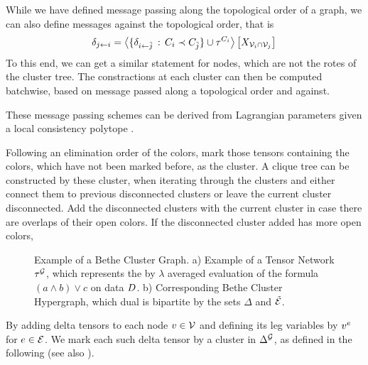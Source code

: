 While we have defined message passing along the topological order of a graph, we can also define messages against the topological order, that is
\begin{align*}
	\downmes{i}{j}  = \contractionof{\{\downmes{\tilde{j}}{i} \wcols  \enc \prec  \thirdenc\} \cup \tnetof{\enc}}{\catvariableof{\nodes_i\cap \nodes_j}} \,
\end{align*}
To this end, we can get a similar statement for nodes, which are not the rotes of the cluster tree.
The constractions at each cluster can then be computed batchwise, based on message passed along a topological order and against.

%
These message passing schemes can be derived from Lagrangian parameters given a local consistency polytope \cite{wainwright_graphical_2008}.





\begin{remark}
	Following an elimination order of the colors, mark those tensors containing the colors, which have not been marked before, as the cluster.
	A clique tree can be constructed by these cluster, when iterating through the clusters and either connect them to previous disconnected clusters or leave the current cluster disconnected.
	Add the disconnected clusters with the current cluster in case there are overlaps of their open colors.
	If the disconnected cluster added has more open colors, 
\end{remark}




\begin{figure}[t]
\begin{center}
	
\end{center}
\caption{Example of a Bethe Cluster Graph.
	a) Example of a Tensor Network $\tnetof{\graph}$, which represents the by $\lambda$ averaged evaluation of the formula $(a\land b)\lor c$ on data $\datamap$.
	b) Corresponding Bethe Cluster Hypergraph, which dual is bipartite by the sets $\Delta$ and $\tilde{\edges}$.
	}
\label{fig:betheDataExample} 
\end{figure}

By adding delta tensors to each node $\node\in\nodes$ and defining its leg variables by $\node^{\edge}$ for $\edge\in\edges$.
We mark each such delta tensor by a cluster in $\Delta^{\graph}$, as defined in the following (see also ).

